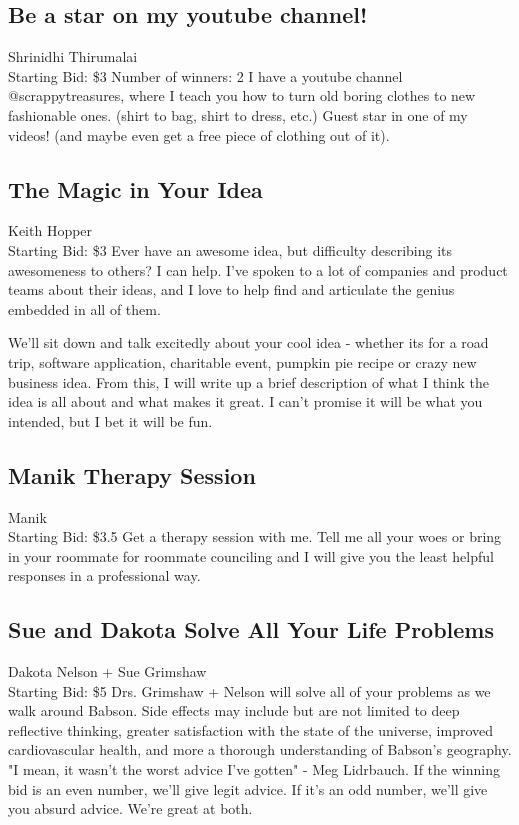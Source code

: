 \documentclass[11pt]{article}
\begin{document}
\subsection{Be a star on my youtube channel!}
Shrinidhi Thirumalai
\\
Starting Bid: \$3
\newline
Number of winners: 2
\newline
I have a youtube channel @scrappytreasures, where I teach you how to turn old boring clothes to new fashionable ones. (shirt to bag, shirt to dress, etc.) Guest star in one of my videos! (and maybe even get a free piece of clothing out of it).
\subsection{The Magic in Your Idea}
Keith Hopper
\\
Starting Bid: \$3
\newline
Ever have an awesome idea, but difficulty describing its awesomeness to others? I can help. I've spoken to a lot of companies and product teams about their ideas, and I love to help find and articulate the genius embedded in all of them.

We'll sit down and talk excitedly about your cool idea - whether its for a road trip, software application, charitable event, pumpkin pie recipe or crazy new business idea. From this, I will write up a brief description of what I think the idea is all about and what makes it great. I can't promise it will be what you intended, but I bet it will be fun.
\subsection{Manik Therapy Session}
Manik
\\
Starting Bid: \$3.5
\newline
Get a therapy session with me. Tell me all your woes or bring in your roommate for roommate counciling and I will give you the least helpful responses in a professional way.
\subsection{Sue and Dakota Solve All Your Life Problems}
Dakota Nelson + Sue Grimshaw
\\
Starting Bid: \$5
\newline
Drs. Grimshaw + Nelson will solve all of your problems as we walk around Babson. Side effects may include but are not limited to deep reflective thinking, greater satisfaction with the state of the universe, improved cardiovascular health, and more a thorough understanding of Babson's geography. "I mean, it wasn't the worst advice I've gotten" - Meg Lidrbauch. If the winning bid is an even number, we'll give legit advice. If it's an odd number, we'll give you absurd advice. We're great at both.
\end{document}
